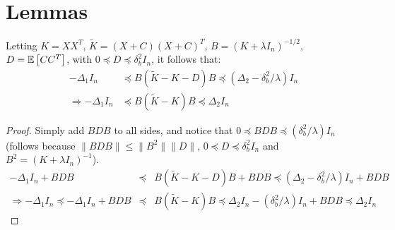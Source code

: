 \documentclass[12pt]{article}
\newcommand{\tK}{\tilde{K}}
\begin{document}
\section{Lemmas}
\begin{lemma}
	\label{lem1}
	Letting $K=XX^T$, $\tK = (X+C)(X+C)^T$, $B = (K+\lambda I_n)^{-1/2}$, $D = \expect{}{CC^T}$, with $0 \preceq D \preceq \delta_b^2 I_n$, it follows that:
	\begin{align*}
-\Delta_1 I_n &\preceq B (\tK - K - D) B \preceq
(\Delta_2 - \delta^2_b/\lambda) I_n \\
\Longrightarrow -\Delta_1 I_n &\preceq B (\tK - K) B \preceq
\Delta_2 I_n
	\end{align*}
\end{lemma}
\begin{proof}
Simply add $BDB$ to all sides, and notice that $0 \preceq BDB \preceq (\delta_b^2/\lambda) I_n$ (follows because $\|BDB\| \leq \|B^2\| \|D\|$, $0 \preceq D \preceq \delta_b^2 I_n$ and $B^2 = (K+\lambda I_n)^{-1}$).
\begin{eqnarray*}
-\Delta_1 I_n + BDB &\preceq& B (\tK - K - D) B  + BDB \preceq
(\Delta_2 - \delta^2_b/\lambda) I_n  + BDB \\
\Longrightarrow -\Delta_1 I_n \preceq  -\Delta_1 I_n + BDB &\preceq& B (\tK - K) B \preceq
\Delta_2 I_n - (\delta_b^2/\lambda) I_n  + BDB \preceq \Delta_2 I_n
\end{eqnarray*}
\end{proof}
\end{document}
